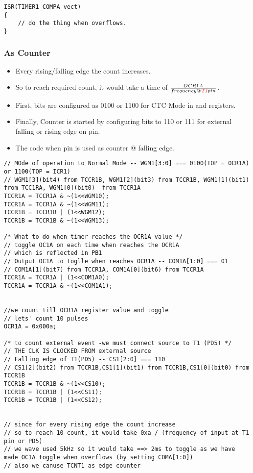 \documentclass{article}
\begin{document}
\begin{verbatim}
ISR(TIMER1_COMPA_vect)
{
    // do the thing when overflows.
}
\end{verbatim}


\subsubsection{As Counter}
\begin{itemize}
    \item Every rising/falling edge the count increases.
    \item So to reach required count, it would take a time of $\frac{OCR1A}{frequency @ \emph{\textcolor{red}{T1}} pin}$.
    \item First,  bits are configured as 0100 or 1100 for CTC Mode in  and  registers.
    \item Finally, Counter is started by configuring  bits to 110 or 111 for external falling or rising edge on  pin.
    \item The code when  pin is used as counter @ falling edge.
\end{itemize}

\begin{verbatim}
// MOde of operation to Normal Mode -- WGM1[3:0] === 0100(TOP = OCR1A) or 1100(TOP = ICR1)
// WGM1[3](bit4) from TCCR1B, WGM1[2](bit3) from TCCR1B, WGM1[1](bit1)  from TCC1RA, WGM1[0](bit0)  from TCCR1A	
TCCR1A = TCCR1A & ~(1<<WGM10);
TCCR1A = TCCR1A & ~(1<<WGM11);
TCCR1B = TCCR1B | (1<<WGM12);
TCCR1B = TCCR1B & ~(1<<WGM13);

/* What to do when timer reaches the OCR1A value */
// toggle OC1A on each time when reaches the OCR1A
// which is reflected in PB1
// Output OC1A to toglle when reaches OCR1A -- COM1A[1:0] === 01
// COM1A[1](bit7) from TCCR1A, COM1A[0](bit6) from TCCR1A
TCCR1A = TCCR1A | (1<<COM1A0);
TCCR1A = TCCR1A & ~(1<<COM1A1);


//we count till OCR1A register value and toggle
// lets' count 10 pulses
OCR1A = 0x000a;

/* to count external event -we must connect source to T1 (PD5) */
// THE CLK IS CLOCKED FROM external source
// Falling edge of T1(PD5) -- CS1[2:0] === 110
// CS1[2](bit2) from TCCR1B,CS1[1](bit1) from TCCR1B,CS1[0](bit0) from TCCR1B
TCCR1B = TCCR1B & ~(1<<CS10);
TCCR1B = TCCR1B | (1<<CS11);
TCCR1B = TCCR1B | (1<<CS12);


// since for every rising edge the count increase
// so to reach 10 count, it would take 0xa / (frequency of input at T1 pin or PD5)
// we wave used 5kHz so it would take ==> 2ms to toggle as we have made OC1A toggle when overflows (by setting COMA[1:0])
// also we canuse TCNT1 as edge counter
\end{verbatim}
\end{document}
